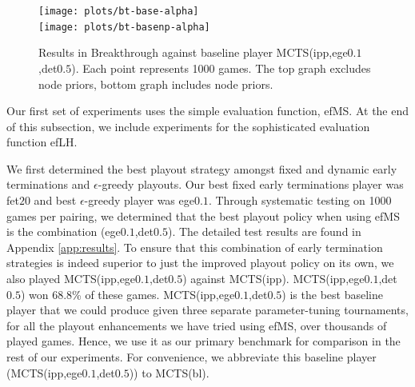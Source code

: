 \documentclass{article}
\begin{document}
\begin{figure}[t!]
\begin{center}
\texttt{[image: plots/bt-base-alpha]}\\
\texttt{[image: plots/bt-basenp-alpha]}
\caption{Results in Breakthrough against 
baseline player MCTS(ipp,ege$0.1$,det$0.5$). 
Each point represents 1000 games. The top graph excludes node priors, bottom graph includes node priors.} 
\label{fig:bt-base-alpha}
\end{center}
\end{figure}

Our first set of experiments uses the simple evaluation function, efMS. At the end of this subsection, we 
include experiments for the sophisticated evaluation function efLH.

We first determined the best playout strategy amongst fixed and dynamic early 
terminations and $\epsilon$-greedy playouts.
Our best fixed early terminations player was fet$20$ and best $\epsilon$-greedy player was ege$0.1$.
Through systematic testing on 1000 games per pairing, we determined that the best playout 
policy when using efMS is the combination (ege$0.1$,det$0.5$). 
The detailed test results are found in Appendix \ref{app:results}.
To ensure that this combination of early termination strategies is indeed superior to just the improved 
playout policy on its own, we also played MCTS(ipp,ege$0.1$,det$0.5$) against MCTS(ipp). 
MCTS(ipp,ege$0.1$,det$0.5$) won 68.8\% of these games.
MCTS(ipp,ege$0.1$,det$0.5$) is the best baseline player that we could produce given three separate 
parameter-tuning tournaments, for all the playout enhancements we have tried using efMS, over 
thousands of played games. Hence, we use it as our primary benchmark for comparison in the 
rest of our experiments. For convenience, we abbreviate this baseline player (MCTS(ipp,ege$0.1$,det$0.5$))
to MCTS(bl). 

\end{document}
